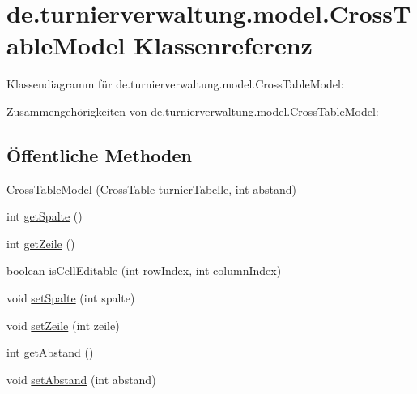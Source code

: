 \hypertarget{classde_1_1turnierverwaltung_1_1model_1_1_cross_table_model}{}\section{de.\+turnierverwaltung.\+model.\+Cross\+Table\+Model Klassenreferenz}
\label{classde_1_1turnierverwaltung_1_1model_1_1_cross_table_model}


Klassendiagramm für de.\+turnierverwaltung.\+model.\+Cross\+Table\+Model\+:


Zusammengehörigkeiten von de.\+turnierverwaltung.\+model.\+Cross\+Table\+Model\+:
\subsection*{Öffentliche Methoden}
\begin{DoxyCompactItemize}
\item 
\hyperlink{classde_1_1turnierverwaltung_1_1model_1_1_cross_table_model_ad87f9ae0a96d5a0da64b0f944fdfd7bd}{Cross\+Table\+Model} (\hyperlink{classde_1_1turnierverwaltung_1_1model_1_1_cross_table}{Cross\+Table} turnier\+Tabelle, int abstand)
\item 
int \hyperlink{classde_1_1turnierverwaltung_1_1model_1_1_cross_table_model_ac56d7f2756ec51c9e77270efb76af428}{get\+Spalte} ()
\item 
int \hyperlink{classde_1_1turnierverwaltung_1_1model_1_1_cross_table_model_a1ec02007b9ccf19875821635303e5bc3}{get\+Zeile} ()
\item 
boolean \hyperlink{classde_1_1turnierverwaltung_1_1model_1_1_cross_table_model_a62afbb7b7510bd13b583df1b7758717b}{is\+Cell\+Editable} (int row\+Index, int column\+Index)
\item 
void \hyperlink{classde_1_1turnierverwaltung_1_1model_1_1_cross_table_model_a570743b9f4914d661721924445a90a45}{set\+Spalte} (int spalte)
\item 
void \hyperlink{classde_1_1turnierverwaltung_1_1model_1_1_cross_table_model_a793102739f372667a28be08421ffee98}{set\+Zeile} (int zeile)
\item 
int \hyperlink{classde_1_1turnierverwaltung_1_1model_1_1_cross_table_model_a0e93ea14ab8b3712572d13656398cb15}{get\+Abstand} ()
\item 
void \hyperlink{classde_1_1turnierverwaltung_1_1model_1_1_cross_table_model_a8236c5de4da827bab31ecd1c006b7dc6}{set\+Abstand} (int abstand)
\end{DoxyCompactItemize}


